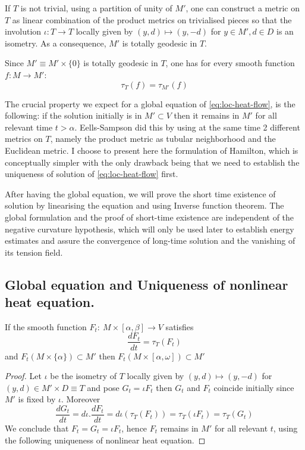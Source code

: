 If \(T\) is not trivial, using a partition of unity of \(M'\), one can construct a metric on \(T\)
as linear combination of the product metrics on trivialised pieces so that
the involution \(\iota: T \longrightarrow T\) locally given by \((y,d)\mapsto (y,-d)\)
for \(y\in M', d\in D\) is an isometry. As a consequence, \(M'\) is totally geodesic
in \(T\).


Since \(M' \equiv M'\times \{0\}\) is totally geodesic in \(T\), one has for every smooth
function \(f: M \longrightarrow M'\):
\[
 \tau_T(f) = \tau_{M'} (f)
\]

The crucial property we expect for a global equation of \eqref{eq:loc-heat-flow}, is the following: if
the solution initially is in \(M'\subset V\) then it remains in \(M'\) for all
relevant time \(t>\alpha\). Eells-Sampson \cite{eells_harmonic_1964} did this by using at
the same time 2 different metrics on \(T\), namely the product metric as tubular
neighborhood and the Euclidean metric. I choose to present here the formulation of
Hamilton, which is conceptually simpler with the only drawback being that we need to
establish the uniqueness of solution of \eqref{eq:loc-heat-flow} first.

After having the global equation, we will prove the short time existence of solution by
linearising the equation and using Inverse function theorem. The global formulation and the
proof of short-time existence are independent of the negative curvature hypothesis, which
will only be used later to establish energy estimates and assure the convergence of
long-time solution and the vanishing of its tension field.


\subsection{Global equation and Uniqueness of nonlinear heat equation.}
\label{sec:orge05193d}
\begin{theorem}
\label{thm:global-eq}
If the smooth function \(F_t:\ M\times [\alpha,\beta] \longrightarrow V\) satisfies
\begin{equation}
\label{eq:global-heat}
\frac{d F_t}{dt} = \tau_T(F_t)
\end{equation}
and \(F_t(M\times \{\alpha\}) \subset M'\) then \(F_t(M\times[\alpha,\omega])\subset M'\)
\end{theorem}
\begin{proof}
Let \(\iota\) be the isometry of \(T\) locally given by \((y,d)\mapsto (y,-d)\) for \((y,d)\in M'\times D \equiv T\) 
and pose \(G_t= \iota F_t\) then \(G_t\) and \(F_t\) coincide initially since \(M'\) is
fixed by \(\iota\). Moreover
\[
\frac{d G_t}{d t} = d\iota . \frac{d F_t}{d t} = d\iota (\tau_T(F_t)) = \tau_T(\iota F_t)=\tau_T(G_t)
\]
We conclude that \(F_t = G_t = \iota F_t\), hence \(F_t\) remains in \(M'\) for all
relevant \(t\), using the following uniqueness of nonlinear heat equation.
\end{proof}

